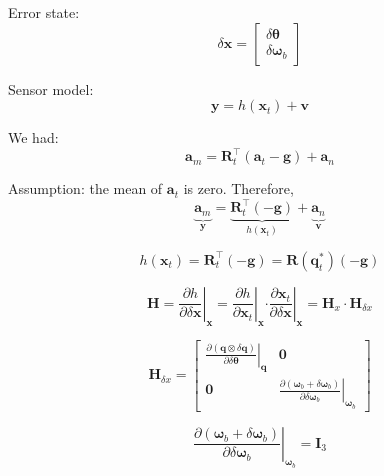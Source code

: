 \documentclass[11pt,a4paper]{scrartcl}
\renewcommand\vec{\bm}
\newcommand{\quat}[1]{\mathbf{#1}}
\newcommand{\Matrix}[1]{\mathbf{#1}}
\newcommand{\qprod}{\otimes}
\begin{document}
Error state:
\begin{equation}
	\delta \vec{x}
	=
	\begin{bmatrix}
		\delta \vec{\theta} \\ \delta \vec{\omega}_b
	\end{bmatrix}
\end{equation}


Sensor model:
\begin{equation}
	\vec{y} = h(\vec{x}_t) + \vec{v}
\end{equation}

We had:
\begin{equation}
	\vec{a}_m = \Matrix{R}_t^\intercal \left( \vec{a}_t - \vec{g} \right) + \vec{a}_n
\end{equation}

Assumption: the mean of $\vec{a}_t$ is zero. Therefore,
\begin{equation}
	\underbrace{\vec{a}_m}_{\vec{y}}  = \underbrace{\Matrix{R}_t^\intercal \left( -\vec{g} \right)}_{h(\vec{x}_t)} + \underbrace{\vec{a}_n}_{\vec{v}}
\end{equation}

\begin{equation}
	h(\vec{x}_t)
	=
	\Matrix{R}_t^\intercal \left( -\vec{g} \right)
	=
	\Matrix{R}\left( \quat{q}_t^* \right) \left( -\vec{g} \right)
\end{equation}

\begin{equation}
	\Matrix{H}
	=
	\left. \frac{\partial h}{\partial \delta \vec{x}} \right|_{\vec{x}}
	=
	\left. \frac{\partial h}{\partial \vec{x}_t} \right|_{\vec{x}} \left. \cdot \frac{\partial \vec{x}_t}{\partial \delta \vec{x}} \right|_{\vec{x}}
	=
	\Matrix{H}_x \cdot \Matrix{H}_{\delta x}
\end{equation}

\begin{equation}
	\Matrix{H}_{\delta x}
	=
	\begin{bmatrix}
		\left.\frac{\partial \left( \quat{q} \qprod \delta \quat{q} \right)}{\partial \delta \vec{\theta}}\right|_{\vec{q}} & \Matrix{0} \\
		\Matrix{0} & \left.\frac{\partial \left( \vec{\omega}_b + \delta \vec{\omega}_b \right)}{\partial \delta \vec{\omega}_b}\right|_{\vec{\omega}_b}
	\end{bmatrix}
\end{equation}

\begin{equation}
	\left.\frac{\partial \left( \vec{\omega}_b + \delta \vec{\omega}_b \right)}{\partial \delta \vec{\omega}_b}\right|_{\vec{\omega}_b}
	=
	\Matrix{I}_3
\end{equation}
\end{document}
